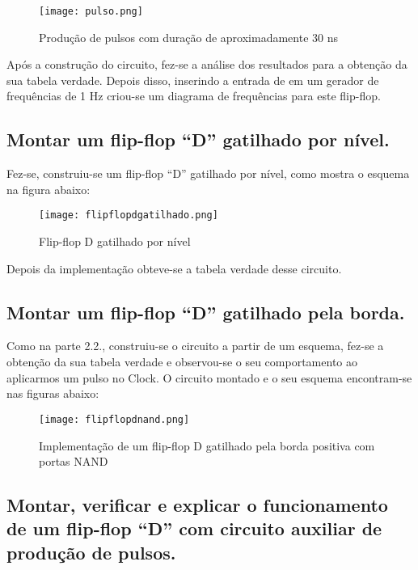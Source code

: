 \documentclass[12pt]{article}
\begin{document}
\begin{figure}[H]
	\centering
	\texttt{[image: pulso.png]}
	\caption{Produção de pulsos com duração de aproximadamente 30 ns}
	\label{fig:pulsoexp}
\end{figure}

Após a construção do circuito, fez-se a análise dos resultados para a obtenção da sua tabela verdade. Depois disso, inserindo a entrada de  em um gerador de frequências de 1 Hz criou-se um diagrama de frequências para este flip-flop.


\subsection{Montar um flip-flop “D” gatilhado por nível.}
\label{2.2}

Fez-se, construiu-se um flip-flop “D” gatilhado por nível, como mostra o esquema na figura abaixo:

\begin{figure}[H]
	\centering
	\texttt{[image: flipflopdgatilhado.png]}
	\caption{Flip-flop D gatilhado por nível}
	\label{fig:flipflopdexp}
\end{figure}

Depois da implementação obteve-se a tabela verdade desse circuito.

\subsection{Montar um flip-flop “D” gatilhado pela borda.}
\label{2.3}

Como na parte 2.2., construiu-se o circuito a partir de um esquema, fez-se a obtenção da sua tabela verdade e observou-se o seu comportamento ao aplicarmos um pulso no Clock. O circuito montado e o seu esquema encontram-se nas figuras abaixo:

\begin{figure}[H]
	\centering
	\texttt{[image: flipflopdnand.png]}
	\caption{Implementação de um flip-flop D gatilhado pela borda positiva com portas NAND}
	\label{fig:flipflpodnandexp}
\end{figure}



\subsection{Montar, verificar e explicar o funcionamento de um flip-flop “D” com circuito auxiliar de produção de pulsos.}
\label{2.4}
\end{document}
